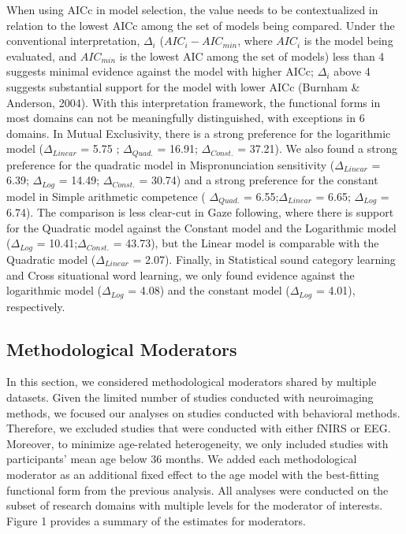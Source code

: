 \documentclass[10pt, letterpaper]{article}
\begin{document}
When using AICc in model selection, the value needs to be contextualized
in relation to the lowest AICc among the set of models being compared.
Under the conventional interpretation, \(\Delta_{i}\)
(\(AIC_i - AIC_{min}\), where \(AIC_i\) is the model being evaluated,
and \(AIC_{min}\) is the lowest AIC among the set of models) less than 4
suggests minimal evidence against the model with higher AICc;
\(\Delta_{i}\) above 4 suggests substantial support for the model with
lower AICc (Burnham \& Anderson, 2004). With this interpretation
framework, the functional forms in most domains can not be meaningfully
distinguished, with exceptions in 6 domains. In Mutual Exclusivity,
there is a strong preference for the logarithmic model
(\(\Delta_{Linear}\) = 5.75 ; \(\Delta_{Quad.}\) = 16.91;
\(\Delta_{Const.}\) = 37.21). We also found a strong preference for the
quadratic model in Mispronunciation sensitivity (\(\Delta_{Linear}\) =
6.39; \(\Delta_{Log}\) = 14.49; \(\Delta_{Const.}\) = 30.74) and a
strong preference for the constant model in Simple arithmetic competence
( \(\Delta_{Quad.}\) = 6.55;\(\Delta_{Linear}\) = 6.65; \(\Delta_{Log}\)
= 6.74). The comparison is less clear-cut in Gaze following, where there
is support for the Quadratic model against the Constant model and the
Logarithmic model (\(\Delta_{Log}\) = 10.41;\(\Delta_{Const.}\) =
43.73), but the Linear model is comparable with the Quadratic model
(\(\Delta_{Linear}\) = 2.07). Finally, in Statistical sound category
learning and Cross situational word learning, we only found evidence
against the logarithmic model (\(\Delta_{Log}\) = 4.08) and the constant
model (\(\Delta_{Log}\) = 4.01), respectively.

\hypertarget{methodological-moderators}{%
\subsection{Methodological Moderators}\label{methodological-moderators}}

In this section, we considered methodological moderators shared by
multiple datasets. Given the limited number of studies conducted with
neuroimaging methods, we focused our analyses on studies conducted with
behavioral methods. Therefore, we excluded studies that were conducted
with either fNIRS or EEG. Moreover, to minimize age-related
heterogeneity, we only included studies with participants' mean age
below 36 months. We added each methodological moderator as an additional
fixed effect to the age model with the best-fitting functional form from
the previous analysis. All analyses were conducted on the subset of
research domains with multiple levels for the moderator of interests.
Figure 1 provides a summary of the estimates for moderators.
\end{document}
